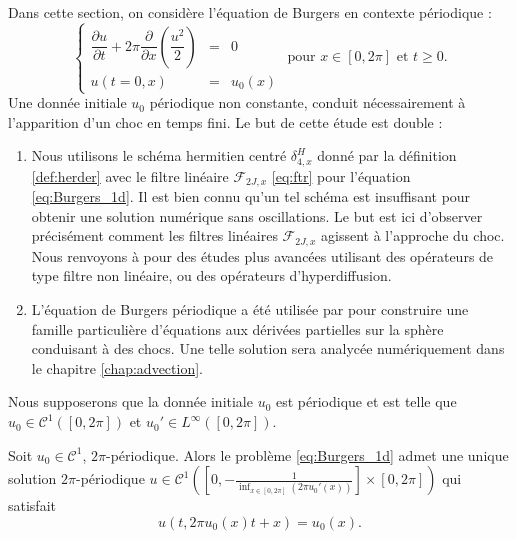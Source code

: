 Dans cette section, on considère l'équation de Burgers en contexte périodique \cite{Burgers1948, Witham1974} :
\begin{equation}
\left\lbrace
\begin{array}{rcl}
\dfrac{\partial u}{\partial t} + 2 \pi \dfrac{\partial}{\partial x} \left( \dfrac{u^2}{2} \right) & = & 0 \\
u(t=0,x) & = & u_0(x)
\end{array}
\right. \text{ pour } x \in [0, 2\pi] \text{ et } t \geq 0.
\label{eq:Burgers_1d}
\end{equation}
Une donnée initiale $u_0$ périodique non constante, conduit nécessairement à l'apparition d'un choc en temps fini. Le but de cette étude est double :
\begin{enumerate}
\item Nous utilisons le schéma hermitien centré $\delta_{4,x}^H$ donné par la définition \ref{def:herder}  avec le filtre linéaire $\mathcal{F}_{2J,x}$ \eqref{eq:ftr} pour l'équation \eqref{eq:Burgers_1d}. Il est bien connu qu'un tel schéma est insuffisant pour obtenir une solution numérique sans oscillations. Le but est ici d'observer précisément comment les filtres linéaires $\mathcal{F}_{2J,x}$ agissent à l'approche du choc. Nous renvoyons à \cite{Yee1989, Cook2005} pour des études plus avancées utilisant des opérateurs de type filtre non linéaire, ou des opérateurs d'hyperdiffusion.

\item L'équation de Burgers périodique a été utilisée par \cite{BenArtzi2009} pour construire une famille particulière d'équations aux dérivées partielles sur la sphère conduisant à des chocs. Une telle solution sera analycée numériquement dans le chapitre \ref{chap:advection}.
\end{enumerate}

Nous supposerons que la donnée initiale $u_0$ est périodique et est telle que $u_0 \in \mathcal{C}^1([0,2 \pi])$ et $u_0' \in L^{\infty}([0,2 \pi])$.

\begin{theoreme}
Soit $u_0 \in \mathcal{C}^1$, $2 \pi$-périodique. Alors le problème \eqref{eq:Burgers_1d} admet une unique solution $2 \pi$-périodique $u \in \mathcal{C}^1\left(\left[0, -\frac{1}{\inf_{x \in [0,2\pi]} (2 \pi u_0'(x))}\right] \times [0, 2 \pi]\right)$ qui satisfait
\begin{equation}
u(t,2 \pi u_0(x)t + x)=u_0(x).
\end{equation}
\end{theoreme}

